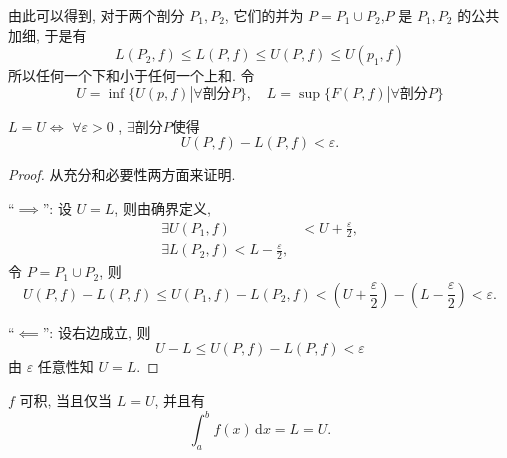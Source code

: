 
由此可以得到, 对于两个剖分 $P_1, P_2$, 它们的并为 $P = P_1 \cup P_2$,$P$ 是 $P_1, P_2$ 的公共加细, 于是有
\begin{equation}
  L(P_2,f) \le L(P, f) \le U(P,f) \le U(p_1,f)
\end{equation}
所以任何一个下和小于任何一个上和.
令 
\begin{equation}
  U = \inf \{ U(p,f) | \forall \text{剖分$P$}\}, \quad L = \sup \{ F(P,f) | \forall \text{剖分$P$} \}
\end{equation}

\begin{proposition}
  $L = U \iff $ $ \forall \varepsilon > 0$ , $\exists \text{剖分}P$使得
  \begin{equation}
    U(P,f) - L(P,f) < \varepsilon.
  \end{equation}
\end{proposition}
\begin{proof}
  从充分和必要性两方面来证明.

  ``$\implies $'':
  设 $U = L$, 则由确界定义, 
  \begin{equation}
    \begin{aligned}
      \exists U(P_1, f) & < U + \frac{\varepsilon}{2}, \\
      \exists L(P_2,f) < L - \frac{\varepsilon}{2},
    \end{aligned}
  \end{equation}
  令 $P = P_1 \cup P_2$, 则
  \begin{equation}
    U(P,f) - L(P,f) \le U(P_1,f) - L(P_2,f) < \left( U + \frac{\varepsilon}{2} \right) - \left( L - \frac{\varepsilon}{2} \right) < \varepsilon.
  \end{equation}

  ``$\impliedby $'':
  设右边成立, 则
  \begin{equation}
    U-L \le  U(P,f) - L(P,f) < \varepsilon
  \end{equation}
  由 $\varepsilon$ 任意性知 $U = L$.
\end{proof}

\begin{theorem}
  $f$ 可积, 当且仅当 $L = U$, 并且有
  \begin{equation}
    \int_{a}^{b} f(x) \, \mathrm{d}x = L = U.
  \end{equation}
\end{theorem}

